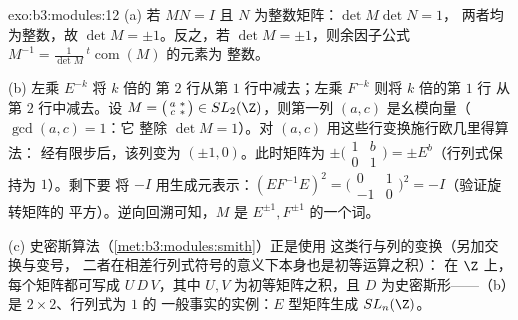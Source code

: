 \begin{solution}{exo:b3:modules:12}
(a) 若 $MN = I$ 且 $N$ 为整数矩阵：$\det M\det N = 1$，
两者均为整数，故 $\det M = \pm1$。反之，若 $\det M =
\pm1$，则余因子公式 $M^{-1} =
\frac1{\det M}\,{}^t\!\operatorname{com}(M)$ 的元素为
整数。

(b) 左乘 $E^{-k}$ 将 $k$ 倍的
第 $2$ 行从第 $1$ 行中减去；左乘 $F^{-k}$ 则将 $k$ 倍的第 $1$ 行
从第 $2$ 行中减去。设 $M = \bigl(\begin{smallmatrix}a & *\\ c &
*\end{smallmatrix}\bigr) \in SL_2(\Z)$，则第一列
$(a, c)$ 是幺模向量（$\gcd(a, c) = 1$：它
整除 $\det M = 1$）。对 $(a, c)$ 用这些行变换施行欧几里得算法：
经有限步后，该列变为
$(\pm1, 0)$。此时矩阵为 $\pm
\bigl(\begin{smallmatrix}1 & b\\ 0 & 1\end{smallmatrix}
\bigr) = \pm E^{b}$（行列式保持为 $1$）。剩下要
将 $-I$ 用生成元表示：$(EF^{-1}E)^2 =
\bigl(\begin{smallmatrix}0 & 1\\ -1 &
0\end{smallmatrix}\bigr)^2 = -I$（验证旋转矩阵的
平方）。逆向回溯可知，$M$ 是 $E^{\pm1},
F^{\pm1}$ 的一个词。

(c) 史密斯算法（\cref{met:b3:modules:smith}）正是使用
这类行与列的变换（另加交换与变号，
二者在相差行列式符号的意义下本身也是初等运算之积）：
在 $\Z$ 上，每个矩阵都可写成
$U\,D\,V$，其中 $U, V$ 为初等矩阵之积，且
$D$ 为史密斯形——（b）是 $2\times2$、行列式为 $1$ 的
一般事实的实例：$E$ 型矩阵生成
$SL_n(\Z)$。
\end{solution}

